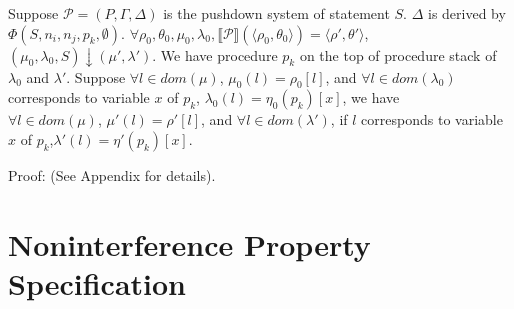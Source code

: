 \documentclass{llncs}
\begin{document}
\begin{theorem} Suppose
$\mathcal{P}=(P,\Gamma,\Delta)$ is the pushdown system of statement
$S$. $\Delta$ is derived by $\Phi(S,n_i,n_j,p_k,\emptyset)$.
$\forall \rho_0,\theta_0,\mu_0,\lambda_0,\llbracket \mathcal
{P}\rrbracket(\langle \rho_0,\theta_0\rangle )=\langle
\rho',\theta'\rangle$,
$(\mu_0,\lambda_0,S)\downarrow(\mu',\lambda')$. We have procedure
$p_k$ on the top of procedure stack of $\lambda_0$ and $\lambda'$.
Suppose $\forall l\in dom(\mu)$, $\mu_0(l)=\rho_0[l]$, and $\forall
l\in
dom(\lambda_0)$ corresponds to variable $x$ of $p_k$, $\lambda_0(l)=\eta_0(p_k)[x]$, we have\\
$\forall l\in dom(\mu)$, $\mu'(l)=\rho'[l]$, and $\forall l\in
dom(\lambda')$, if $l$ corresponds to variable $x$ of
$p_k$,$\lambda'(l)=\eta'(p_k)[x]$.
\end{theorem}
Proof: (See Appendix for details).

\section{\label{sec:prop_spec}Noninterference Property Specification}
\end{document}
